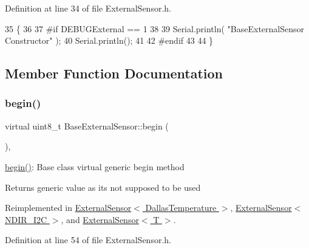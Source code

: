 Definition at line 34 of file External\+Sensor.\+h.


\begin{DoxyCode}
35     \{
36 
37 \textcolor{preprocessor}{    #if DEBUGExternal == 1 }
38 
39         Serial.println( \textcolor{stringliteral}{"BaseExternalSensor Constructor"} );
40         Serial.println();
41     
42 \textcolor{preprocessor}{    #endif}
43 
44     \}
\end{DoxyCode}


\subsection{Member Function Documentation}
\mbox{\label{class_base_external_sensor_a87d132803d4f4fdd4e66332809f0c9a0}} 
\subsubsection{\texorpdfstring{begin()}{begin()}}
{\footnotesize\ttfamily virtual uint8\+\_\+t Base\+External\+Sensor\+::begin (\begin{DoxyParamCaption}{ }\end{DoxyParamCaption})\hspace{0.3cm}{\ttfamily [inline]}, {\ttfamily [virtual]}}

\hyperlink{class_base_external_sensor_a87d132803d4f4fdd4e66332809f0c9a0}{begin()}\+: Base class virtual generic begin method

\begin{DoxyReturn}{Returns}
generic value as it\textquotesingle{}s not supposed to be used 
\end{DoxyReturn}


Reimplemented in \hyperlink{class_external_sensor_3_01_dallas_temperature_01_4_ac5275129b05e2ff8df45d5b222a661d9}{External\+Sensor$<$ Dallas\+Temperature $>$}, \hyperlink{class_external_sensor_3_01_n_d_i_r___i2_c_01_4_ac6f3614d94968ef0cc11b2b4d69cef03}{External\+Sensor$<$ N\+D\+I\+R\+\_\+\+I2\+C $>$}, and \hyperlink{class_external_sensor_ab6fe1379d55b656a048e0fba1e0a32e6}{External\+Sensor$<$ T $>$}.



Definition at line 54 of file External\+Sensor.\+h.


